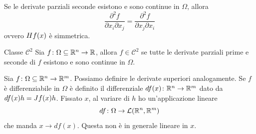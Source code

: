 \documentclass[a4paper]{article}
\begin{document}
\begin{radioactive}
\begin{snippetcorollary}{}
    Se le derivate parziali seconde esistono e sono continue in \(\Omega\),
    allora
    \[
        \frac{\partial^2 f}{\partial x_i \partial x_j} =
        \frac{\partial^2 f}{\partial x_j \partial x_i}
    \]
    ovvero \(H f(x)\) è simmetrica.
\end{snippetcorollary}

\begin{snippetdefinition}{Classe \(\mathcal{C}^2\)}
    Sia \(f \colon \Omega \subseteq \mathbb{R}^n \to \mathbb{R}\),
    allora \(f \in \mathcal{C}^2\) se tutte le derivate parziali prime e seconde di \(f\)
    esistono e sono continue in \(\Omega\).
\end{snippetdefinition}
\end{radioactive}

\begin{radioactive}
Sia \(f \colon \Omega \subseteq \mathbb{R}^n \to \mathbb{R}^m\).
Possiamo definire le derivate superiori analogamente.
Se \(f\) è differenziabile in \(\Omega\) è definito il differenziale
\(df(x) \colon \mathbb{R}^n \to \mathbb{R}^m\) dato da
\(df(x)h = J f(x)h\).
Fissato \(x\), al variare di \(h\) ho un'applicazione lineare
\[
    df\colon \Omega \to \mathcal{L}(\mathbb{R}^n, \mathbb{R}^m)
\]
che manda \(x \to df(x)\).
Questa non è in generale lineare in \(x\).
\end{radioactive}
\end{document}
